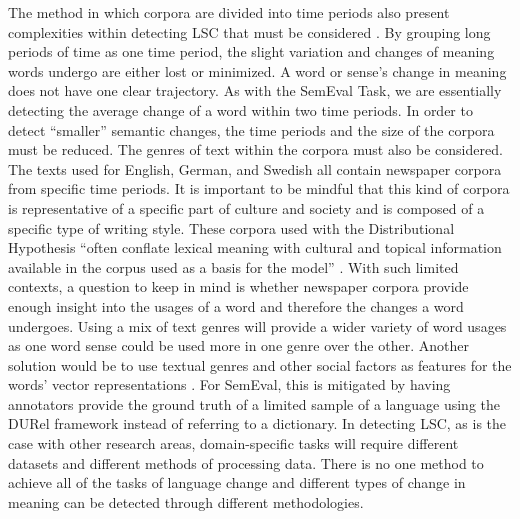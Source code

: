 The method in which corpora are divided into time periods also present complexities within detecting LSC that must be considered \citep{hengchen2021challenges}. By grouping long periods of time as one time period, the slight variation and changes of meaning words undergo are either lost or minimized. A word or sense’s change in meaning does not have one clear trajectory. As with the SemEval Task, we are essentially detecting the average change of a word within two time periods. In order to detect “smaller” semantic changes, the time periods and the size of the corpora must be reduced. The genres of text within the corpora must also be considered. The texts used for English, German, and Swedish all contain newspaper corpora from specific time periods. It is important to be mindful that this kind of corpora is representative of a specific part of culture and society and is composed of a specific type of writing style. These corpora used with the Distributional Hypothesis “often conflate lexical meaning with cultural and topical information available in the corpus used as a basis for the model” \citep{hengchen2021challenges}. With such limited contexts, a question to keep in mind is whether newspaper corpora provide enough insight into the usages of a word and therefore the changes a word undergoes. Using a mix of text genres will provide a wider variety of word usages as one word sense could be used more in one genre over the other. Another solution would be to use textual genres and other social factors as features for the words' vector representations \citep{perrone-etal-2019-gasc, jawahar-seddah-2019-contextualized}. For SemEval, this is mitigated by having annotators provide the ground truth of a limited sample of a language using the DURel framework \citep{DURel2018} instead of referring to a dictionary. In detecting LSC, as is the case with other research areas, domain-specific tasks will require different datasets and different methods of processing data. There is no one method to achieve all of the tasks of language change and different types of change in meaning can be detected through different methodologies. 
